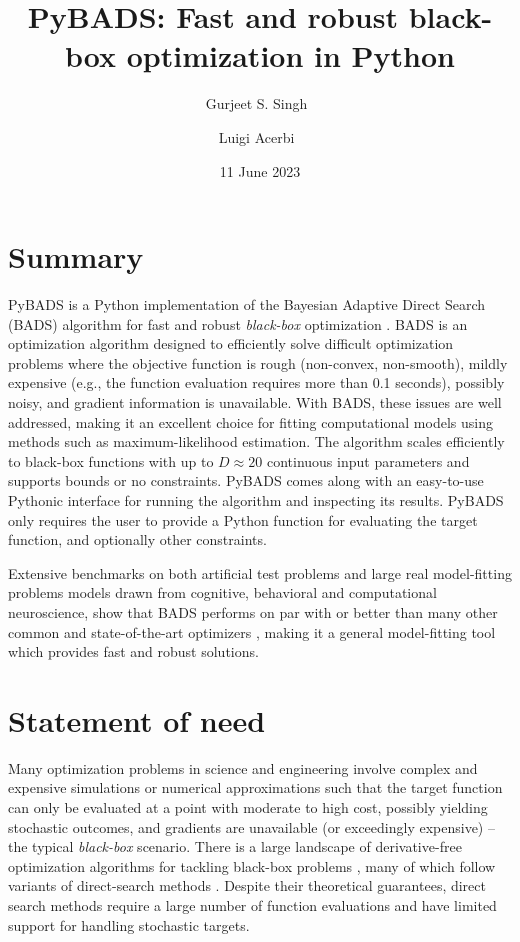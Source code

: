 \documentclass[
]{article}
\title{PyBADS: Fast and robust black-box optimization in Python}
\author[1, 3%
  ]{Gurjeet S. Singh%
    \,%
    }
\author[2%
  ]{Luigi Acerbi%
    \,%
    }
\affil[1]{University of Geneva}
\affil[2]{University of Helsinki}
\affil[3]{University of Applied Sciences and Art Western Switzerland (HES-SO)}
\date{11 June 2023}
\begin{document}
\maketitle

\hypertarget{summary}{%
\section{Summary}\label{summary}}
PyBADS is a Python implementation of the Bayesian Adaptive Direct Search (BADS) algorithm for fast and robust \textit{black-box} optimization \parencite{acerbi2017practical}. BADS is an optimization algorithm designed to efficiently solve difficult optimization problems where the objective function is rough (non-convex, non-smooth), mildly expensive (e.g., the function evaluation requires more than 0.1 seconds), possibly noisy, and gradient information is unavailable. With BADS, these issues are well addressed, making it an excellent choice for fitting computational models using methods such as maximum-likelihood estimation.
The algorithm scales efficiently to black-box functions with up to $D \approx 20$ continuous input parameters and supports bounds or no constraints. PyBADS comes along with an easy-to-use Pythonic interface for running the algorithm and inspecting its results. PyBADS only requires the user to provide a Python function for evaluating the target function, and optionally other constraints.

Extensive benchmarks on both artificial test problems and large real model-fitting problems models drawn from cognitive, behavioral and computational neuroscience, show that BADS performs on par with or better than many other common and state-of-the-art optimizers \parencite{acerbi2017practical}, making it a general model-fitting tool which provides fast and robust solutions. 

\hypertarget{statement-of-need}{%
\section{Statement of need}\label{statement-of-need}}

Many optimization problems in science and engineering involve complex and expensive simulations or numerical approximations such that the target function can only be evaluated at a point with moderate to high cost, possibly yielding stochastic outcomes, and gradients are unavailable (or exceedingly expensive) -- the typical \textit{black-box} scenario. There is a large landscape of derivative-free optimization algorithms for tackling black-box problems  \parencite{Rios2013}, many of which follow variants of direct-search methods \parencite{MADS, stoMADS, orthoMADS, deng2006adaptation}.
Despite their theoretical guarantees, direct search methods require a large number of function evaluations and have limited support for handling stochastic targets. 
\end{document}
